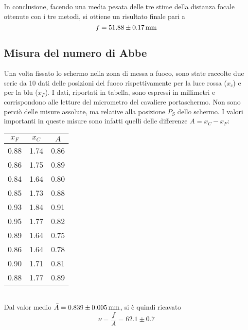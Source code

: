 \documentclass[italian,a4paper]{article}
\begin{document}
In conclusione, facendo una media pesata delle tre stime della distanza focale ottenute con i tre metodi, si ottiene un risultato finale pari a 
$$f=\unit[51.88 \pm 0.17]{mm}$$
\newpage
\subsection{Misura del numero di Abbe}
Una volta fissato lo schermo nella zona di messa a fuoco, sono state raccolte due serie da 10 dati delle posizioni del fuoco rispettivamente per la luce rossa ($x_c$) e per la blu ($x_F$). I dati, riportati in tabella, sono espressi in millimetri e corrispondono alle letture del micrometro del cavaliere portaschermo. Non sono perciò delle misure assolute, ma relative alla posizione $P_S$ dello schermo. I valori importanti in queste misure sono infatti quelli delle differenze $A=x_C-x_F$:
\begin{table}[!h]
\centering
\begin{tabular}{*3c}
$x_F$& $x_C$& $A$\\\hline
0.88 &1.74 &0.86\\
0.86 &1.75 &0.89\\
0.84 &1.64 &0.80\\
0.85 &1.73 &0.88\\
0.93 &1.84 &0.91\\
0.95 &1.77 &0.82\\
0.89 &1.64 &0.75\\
0.86 &1.64 &0.78\\
0.90 &1.71 &0.81\\
0.88 &1.77 &0.89\\
\end{tabular}
\end{table}\\
Dal valor medio $\bar{A}=\unit[0.839\pm0.005]{mm}$, si è quindi ricavato
\begin{equation*}
 \nu=\dfrac{f}{A}=62.1\pm0.7
\end{equation*}
\end{document}
